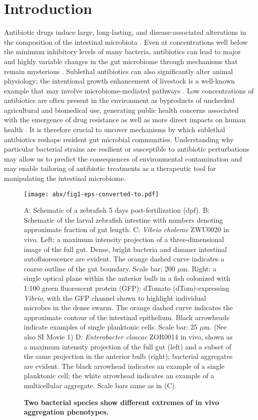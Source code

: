  \section{Introduction}


    Antibiotic drugs induce large, long-lasting, and disease-associated alterations in the composition of the intestinal microbiota \cite{relmanABX_2011,cho2012antibiotics,schulfer2019impact}. Even at concentrations well below the minimum inhibitory levels of many bacteria, antibiotics can lead to major and highly variable changes in the gut microbiome through mechanisms that remain mysterious \cite{cho2012antibiotics,schulfer2019impact,gaulke2016triclosan}. Sublethal antibiotics can also significantly alter animal physiology; the intentional growth enhancement of livestock is a well-known example that may involve microbiome-mediated pathways \cite{cho2012antibiotics}. Low concentrations of antibiotics are often present in the environment as byproducts of unchecked agricultural and biomedical use, generating public health concerns associated with the emergence of drug resistance \cite{andersson2014microbiological} as well as more direct impacts on human health \cite{national2018environmental}. It is therefore crucial to uncover mechanisms by which sublethal antibiotics reshape resident gut microbial communities. Understanding why particular bacterial strains are resilient or susceptible to antibiotic perturbations may allow us to predict the consequences of environmental contamination and may enable tailoring of antibiotic treatments as a therapeutic tool for manipulating the intestinal microbiome.  

\begin{figure}%
\centerline{
	\texttt{[image: abx/fig1-eps-converted-to.pdf]}}
	\caption{\textbf{Two bacterial species show different extremes of in vivo aggregation phenotypes.}}{  A: Schematic of a zebrafish 5 days post-fertilization (dpf). B: Schematic of the larval zebrafish intestine with numbers denoting approximate fraction of gut length. C: \textit{Vibrio cholerae} ZWU0020 in vivo. Left: a maximum intensity projection of a three-dimensional image of the full gut. Dense, bright bacteria and dimmer intestinal autofluorescence are evident. The orange dashed curve indicates a coarse outline of the gut boundary. Scale bar: 200 $\mu$m. Right: a single optical plane within the anterior bulb in a fish colonized with 1:100 green fluorescent protein (GFP): dTomato (dTom)-expressing \textit{Vibrio}, with the GFP channel shown to highlight individual microbes in the dense swarm. The orange dashed curve indicates the approximate contour of the intestinal epithelium. Black arrowheads indicate examples of single planktonic cells. Scale bar: 25 $\mu$m. (See also SI Movie 1) D: \textit{Enterobacter cloacae} ZOR0014 in vivo, shown as a maximum intensity projection of the full gut (left) and a subset of the same projection in the anterior bulb (right); bacterial aggregates are evident. The black arrowhead indicates an example of a single planktonic cell; the white arrowhead indicates an example of a multicellular aggregate. Scale bars same as in (C).}
\end{figure}


